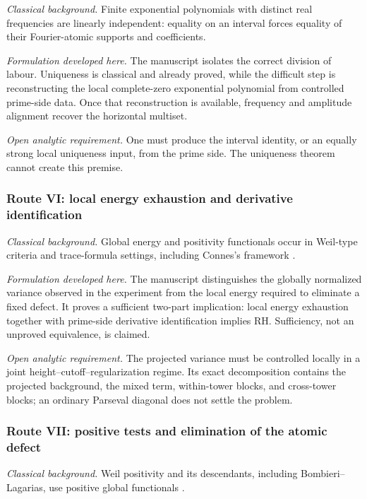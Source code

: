 \documentclass[11pt]{amsart}
\numberwithin{equation}{section}
\theoremstyle{plain}
\theoremstyle{definition}
\theoremstyle{remark}
\newcommand{\1}{\mathbf{1}}
\begin{document}
\emph{Classical background.}
Finite exponential polynomials with distinct real frequencies are linearly
independent: equality on an interval forces equality of their Fourier-atomic
supports and coefficients.

\emph{Formulation developed here.}
The manuscript isolates the correct division of labour. Uniqueness is
classical and already proved, while the difficult step is reconstructing the
local complete-zero exponential polynomial from controlled prime-side data.
Once that reconstruction is available, frequency and amplitude alignment
recover the horizontal multiset.

\emph{Open analytic requirement.}
One must produce the interval identity, or an equally strong local uniqueness
input, from the prime side. The uniqueness theorem cannot create this premise.

\subsubsection*{Route VI: local energy exhaustion and derivative identification}

\emph{Classical background.}
Global energy and positivity functionals occur in Weil-type criteria and
trace-formula settings, including Connes's framework
\cite{Weil1952,Connes1999}.

\emph{Formulation developed here.}
The manuscript distinguishes the globally normalized variance observed in the
experiment from the local energy required to eliminate a fixed defect. It
proves a sufficient two-part implication: local energy exhaustion together
with prime-side derivative identification implies RH. Sufficiency, not an
unproved equivalence, is claimed.

\emph{Open analytic requirement.}
The projected variance must be controlled locally in a joint
height--cutoff--regularization regime. Its exact decomposition contains the
projected background, the mixed term, within-tower blocks, and cross-tower
blocks; an ordinary Parseval diagonal does not settle the problem.

\subsubsection*{Route VII: positive tests and elimination of the atomic defect}

\emph{Classical background.}
Weil positivity and its descendants, including Bombieri--Lagarias, use
positive global functionals \cite{Weil1952,BombieriLagarias1999}.
\end{document}
